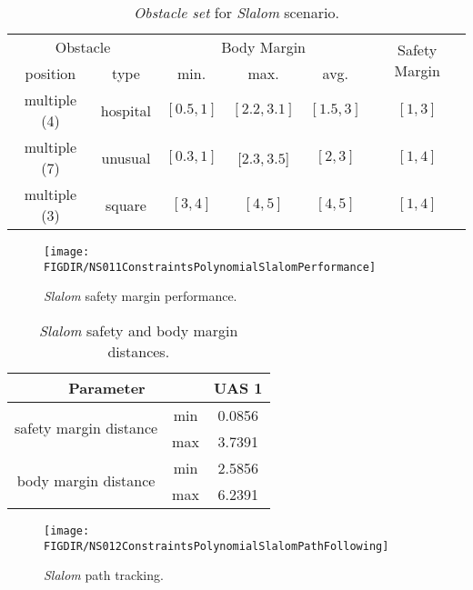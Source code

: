     
    \begin{table}[H]
        \centering
        \begin{tabular}{c|c|c|c|c|c}
            \multicolumn{2}{c|}{Obstacle} & \multicolumn{3}{c|}{Body Margin} & \multirow{2}{*}{Safety Margin}\\\cline{1-5}
            position & type & min. & max. & avg. &   \\\hline\hline
            multiple (4) & hospital & $[0.5,1]$ & $[2.2,3.1]$ & $[1.5,3]$  & $[1,3]$ \\\hline 
            multiple (7) & unusual  & $[0.3,1]$ & $[2.3,3.5$] & $[2,3]$  & $[1,4]$ \\\hline
            multiple (3) & square   & $[3,4]$   & $[4,5]$     & $[4,5]$ & $[1,4]$   \\
         \end{tabular}
        \caption{\emph{Obstacle set} for \emph{Slalom} scenario.}
        \label{tab:obstacleSetSlalom}
    \end{table}
    
    
    \begin{figure}[H]
        \centering
        \texttt{[image: \\FIGDIR/NS011ConstraintsPolynomialSlalomPerformance]} 
        \caption{\emph{Slalom} safety margin performance.}
        \label{fig:testCaseSlalomAvoidancePerformance}
    \end{figure}
    
    
    \begin{table}[H]
        \centering
        \begin{tabular}{c|c||c}
        \multicolumn{2}{c||}{Parameter} & UAS 1 \\\hline\hline
        \multirow{2}{*}{safety margin distance} & min & 0.0856\\\cline{2-3}
                                                & max & 3.7391 \\\hline
        \multirow{2}{*}{body margin distance}   & min & 2.5856  \\\cline{2-3}
                                                & max & 6.2391 
        \end{tabular}
        \caption{\emph{Slalom} safety and body margin distances.}
        \label{tab:testCaseSlalomSafetyAndBodyMarginDistances}
    \end{table}
    
    
    \begin{figure}[H]
        \centering
        \texttt{[image: \\FIGDIR/NS012ConstraintsPolynomialSlalomPathFollowing]} 
        \caption{\emph{Slalom} path tracking.}
        \label{fig:testCaseSlalomPathTracking}
    \end{figure}
    
